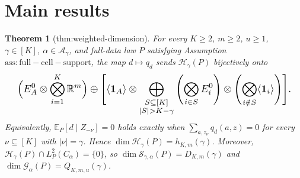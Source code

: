 \documentclass{article}
\newtheorem{theorem}{Theorem}
\begin{document}
\section{Main results}

\begin{theorem}[thm:weighted-dimension]\label{thm:weighted-dimension}
For every \(K\ge2\), \(m\ge2\), \(u\ge1\), \(\gamma\in[K]\), \(\alpha\in\mathcal A_\gamma\), and full-data law \(P\) satisfying Assumption \(\mathrm{ass:full-cell-support}\), the map \(d\mapsto q_d\) sends \(\mathcal H_\gamma(P)\) bijectively onto \[
\makebox[\linewidth][c]{\resizebox{0.98\linewidth}{!}{\par\noindent \makebox[\linewidth][c]{\resizebox{0.98\linewidth}{!}{\(\displaystyle \displaystyle \Bigl(E_A^0\otimes\bigotimes_{i=1}^K\mathbb R^m\Bigr)\oplus\Biggl[\langle\mathbf1_A\rangle\otimes\bigoplus_{\substack{S\subseteq[K]\\|S|>K-\gamma}}\left(\bigotimes_{i\in S}E_i^0\right)\otimes\left(\bigotimes_{i\notin S}\langle\mathbf1_i\rangle\right)\Biggr].\)}}\par\noindent}}
\] Equivalently, \(\mathbb E_P[d\mid Z_{-\nu}]=0\) holds exactly when \(\sum_{a,z_\nu}q_d(a,z)=0\) for every \(\nu\subseteq[K]\) with \(|\nu|=\gamma\). Hence \(\dim\mathcal H_\gamma(P)=h_{K,m}(\gamma)\). Moreover, \(\mathcal H_\gamma(P)\cap L_P^2(C_\alpha)=\{0\}\), so \(\dim\mathcal S_{\gamma,\alpha}(P)=D_{K,m}(\gamma)\) and \(\dim\mathcal G_\alpha(P)=Q_{K,m,u}(\gamma)\).
\end{theorem}
\end{document}
